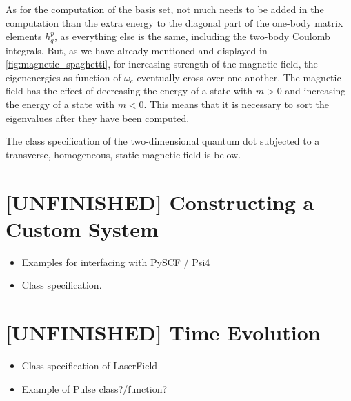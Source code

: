 As for the computation of the basis set, not much needs to be added in the computation 
than the extra energy to the diagonal part of the one-body matrix elements $h^p_q$, as 
everything else is the same, including the two-body Coulomb integrals. But, as we have 
already mentioned and displayed in \autoref{fig:magnetic_spaghetti}, for increasing 
strength of the magnetic field, the eigenenergies as function  of $\omega_c$ eventually 
cross over one another. The magnetic field has the effect of decreasing the energy of
a state with $m>0$ and increasing the energy of a state with $m<0$. This means that 
it is necessary to sort the eigenvalues after they have been computed. 

The class specification of the two-dimensional quantum dot subjected to a transverse,
homogeneous, static magnetic field is below.


\section{[UNFINISHED] Constructing a Custom System}

\begin{itemize}
    \item Examples for interfacing with PySCF / Psi4 
    \item Class specification.
\end{itemize}

\section{[UNFINISHED] Time Evolution}

\begin{itemize}
    \item Class specification of LaserField
    \item Example of Pulse class?/function?
\end{itemize}

